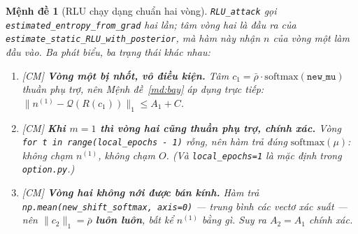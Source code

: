 \documentclass[11pt,a4paper]{article}
\newtheorem{menhde}[dinhly]{Mệnh đề}
\theoremstyle{remark}
\newcommand{\quant}{\mathcal{Q}}
\newcommand{\code}[1]{\texttt{\small #1}}
\newcommand{\CM}{\textsf{[CM]}}
\begin{document}
\begin{menhde}[RLU chạy dạng chuẩn hai vòng] \label{md:rlu2}
\code{RLU\_attack} gọi \code{estimated\_entropy\_from\_grad} \emph{hai lần}; tâm
vòng hai là đầu ra của \code{estimate\_static\_RLU\_with\_posterior}, mà hàm này
\emph{nhận $n$ của vòng một} làm đầu vào. Ba phát biểu, ba trạng thái khác nhau:
\begin{enumerate}
\item \CM{} \textbf{Vòng một bị nhốt, vô điều kiện.} Tâm $c_1=\bar\rho\cdot
\mathrm{softmax}(\texttt{new\_mu})$ thuần phụ trợ, nên Mệnh đề~\ref{md:bay} áp
dụng trực tiếp: $\|n^{(1)}-\quant(R(c_1))\|_1\le A_1+C$.

\item \CM{} \textbf{Khi $m=1$ thì vòng hai cũng thuần phụ trợ, chính xác.} Vòng
\code{for t in range(local\_epochs - 1)} rỗng, nên hàm trả đúng
$\mathrm{softmax}(\mu)$: không chạm $n^{(1)}$, không chạm $O$. (Và
\code{local\_epochs=1} là mặc định trong \code{option.py}.)

\item \CM{} \textbf{Vòng hai không nới được bán kính.} Hàm trả
\code{np.mean(new\_shift\_softmax, axis=0)} --- trung bình các vectơ xác suất ---
nên $\|c_2\|_1=\bar\rho$ \textbf{luôn luôn}, bất kể $n^{(1)}$ bằng gì. Suy ra
$A_2=A_1$ \emph{chính xác}.
\end{enumerate}
\end{menhde}
\end{document}
